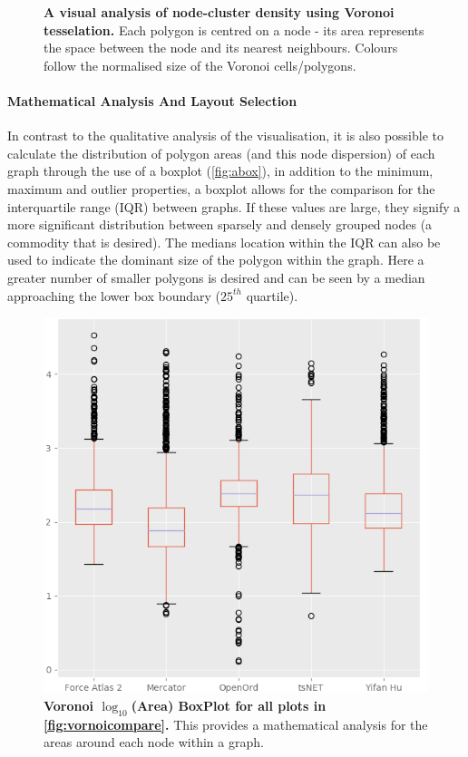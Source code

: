 \begin{figure}[H]
        \caption{\textbf{A visual analysis of node-cluster density using Voronoi tesselation.} Each polygon is centred on a node - its area represents the space between the node and its nearest neighbours. Colours follow the normalised size of the Voronoi cells/polygons.}
        \label{fig:vornoicompare}
\end{figure}



\paragraph*{Mathematical Analysis And Layout Selection}
In contrast to the qualitative analysis of the visualisation, it is also possible to calculate the distribution of polygon areas (and this node dispersion) of each graph through the use of a boxplot (\autoref{fig:abox}), in addition to the minimum, maximum and outlier properties, a boxplot allows for the comparison for the interquartile range (IQR) between graphs. If these values are large, they signify a more significant distribution between sparsely and densely grouped nodes (a commodity that is desired). The medians location within the IQR can also be used to indicate the dominant size of the polygon within the graph. Here a greater number of smaller polygons is desired and can be seen by a median approaching the lower box boundary ($25^{th}$ quartile).

\begin{figure}[H]
\centering \includegraphics[width=.6\textwidth]{figures_c1/area/log10layoutbox.png}
\caption{\textbf{Voronoi $\log_{10}$(Area) BoxPlot for all plots in \autoref{fig:vornoicompare}.} This provides a mathematical analysis for the areas around each node within a graph. }
\label{fig:abox}
\end{figure}

